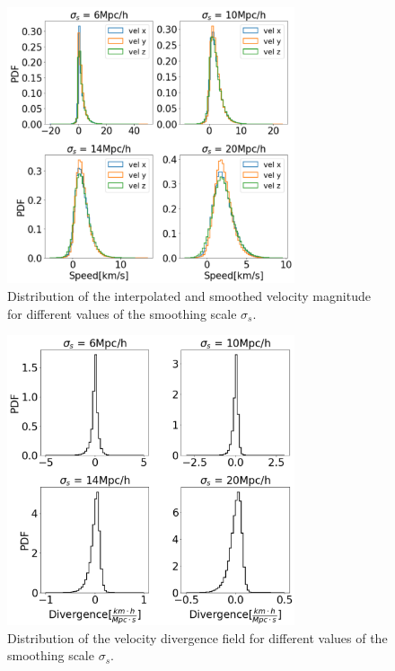 \documentclass[usenatbib]{mnras}
\begin{document}
\begin{figure}
    \centering
    \includegraphics[width=240pt]{smooth_vel_dist.pdf}
    \caption{Distribution of the interpolated and smoothed velocity
      magnitude for different values of the smoothing scale $\sigma_{s}$.}
    \label{fig:smooth_vel_dist}
\end{figure}



\begin{figure}
    \centering
    \includegraphics[width=240pt]{smooth_grad_dist.pdf}
    \caption{Distribution of the velocity divergence field
      for different values of the smoothing scale $\sigma_s$.}
    \label{fig:smooth_grad_dist}
\end{figure}
\end{document}
